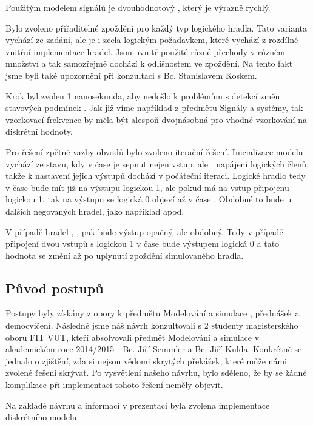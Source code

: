 \documentclass[11pt,a4paper]{article}
\begin{document}
			Použitým modelem signálů je dvouhodnotový , který je výrazně rychlý.

			Bylo zvoleno přiřaditelné zpoždění  pro každý typ logického hradla. Tato varianta vychází ze zadání, ale je i zcela logickým požadavkem, které vychází z rozdílné vnitřní implementace hradel. Jsou uvnitř použité různé přechody v různém množství a tak samozřejmě dochází k odlišnostem ve zpoždění. Na tento fakt jsme byli také upozornění při konzultaci s Bc. Stanislavem Koskem.

			Krok byl zvolen 1 nanosekunda, aby nedošlo k problémům s detekcí změn stavových podmínek . Jak již víme například z předmětu Signály a systémy, tak vzorkovací frekvence by měla být alespoň dvojnásobná pro vhodné vzorkování na diskrétní hodnoty.

			Pro řešení zpětné vazby obvodů bylo zvoleno iterační řešení. Inicializace modelu  vychází ze stavu, kdy v čase  je sepnut nejen vstup, ale i napájení logických členů, takže k nastavení jejich výstupů dochází v počáteční iteraci. Logické hradlo  tedy v čase  bude mít již na výstupu logickou 1, ale pokud má na vstup připojenu logickou 1, tak na výstupu se logická 0 objeví až v čase . Obdobné to bude u dalších negovaných hradel, jako například  apod.

			V případě hradel , ,  pak bude výstup opačný, ale obdobný. Tedy v případě připojení dvou vstupů s logickou 1 v čase  bude výstupem logická 0 a tato hodnota se změní až po uplynutí zpoždění simulovaného hradla.

		\subsection{Původ postupů}
			Postupy byly získány z opory k předmětu Modelování a simulace \cite{imsSlide}, přednášek a democvičení. Následně jsme náš návrh konzultovali s 2 studenty magisterského oboru FIT VUT, kteří absolvovali předmět Modelování a simulace v akademickém roce 2014/2015 - Bc. Jiří Semmler a Bc. Jiří Kulda. Konkrétně se jednalo o zjištění, zda si nejsou vědomi skrytých překážek, které může námi zvolené řešení skrývat. Po vysvětlení našeho návrhu, bylo sděleno, že by se žádné komplikace při implementaci tohoto řešení neměly objevit.

			Na základě návrhu a informací v prezentaci  byla zvolena implementace diskrétního modelu.
\end{document}
